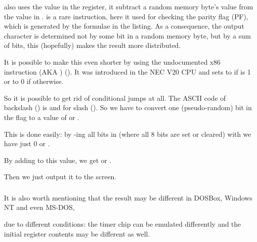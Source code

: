  also uses the value in the 
 register, it subtract a random memory byte's value from the  value in .
 is a rare instruction, here it used for checking the parity flag (PF), 
which is generated by the formulae in the listing.
As a consequence, the output character 
is determined not by some bit in a random memory byte, but by a sum of bits, 
this (hopefully) makes the result more distributed.

It is possible to 
make this even shorter by using the undocumented x86 instruction  (\ac{AKA} ) ().
It was introduced in the NEC V20 \ac{CPU} and sets  to 
 if  is 1 or to 0 if otherwise.



So it is possible to get rid of conditional jumps at all.
The \ac{ASCII} code of backslash (\q{\textbackslash{}}) 
is  and  for slash (\q{/}).
So we have to convert one (pseudo-random) bit in the  flag to a value of  or .

This is done easily: by -ing all bits in  (where all 8 bits are set or cleared) with  we have just 0 or .

By adding  to this value, we get  or .

Then we just output it to the screen.

\subsubsection{\Conclusion{}}

It is also worth mentioning that the result may 
be different in DOSBox, \gls{Windows NT} and even MS-DOS, 

due to different
conditions: the timer chip can be emulated differently and the initial register contents may be different as well.
